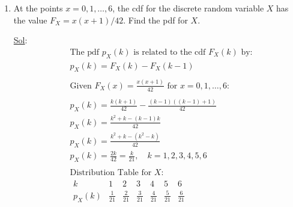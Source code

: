 \begin{enumerate}
  \item[14.] At the points \(x = 0, 1, \dots, 6 \), the cdf for the
    discrete random variable \(X\) has the value \(F_X = x(x +
    1)/42\). Find the pdf for \(X\).

    \underline{Sol}:\\
    $$
    \begin{aligned}
      & \text{The pdf } p_X(k) \text{ is related to the cdf } F_X(k)
      \text{ by:} \\
      & p_X(k) = F_X(k) - F_X(k-1) \\
      \\
      & \text{Given } F_X(x) = \frac{x(x+1)}{42} \text{ for } x = 0,
      1, \dots, 6: \\
      \\
      & p_X(k) = \frac{k(k+1)}{42} - \frac{(k-1)((k-1)+1)}{42} \\
      & p_X(k) = \frac{k^2 + k - (k-1)k}{42} \\
      & p_X(k) = \frac{k^2 + k - (k^2 - k)}{42} \\
      & p_X(k) = \frac{2k}{42} = \frac{k}{21}, \quad k = 1, 2, 3, 4, 5, 6 \\
      \\
      & \text{Distribution Table for } X: \\
      &
      \begin{array}{c|cccccc}
        k & 1 & 2 & 3 & 4 & 5 & 6 \\
        \hline
        p_X(k) & \frac{1}{21} & \frac{2}{21} & \frac{3}{21} &
        \frac{4}{21} & \frac{5}{21} & \frac{6}{21} \\
      \end{array}
    \end{aligned}$$
\end{enumerate}
